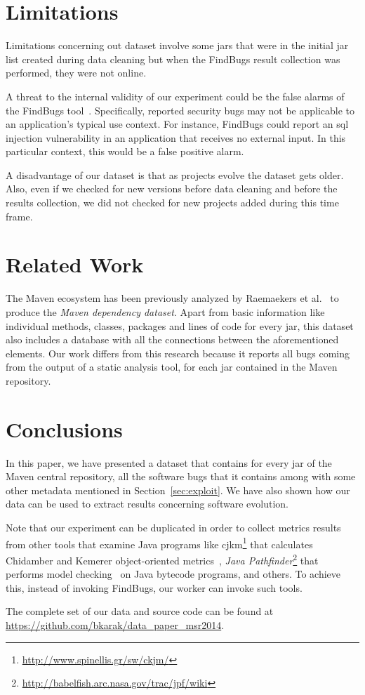 \documentclass{sig-alternate}
\begin{document}
\section{Limitations}
\label{sec:limit}

Limitations concerning out dataset involve some
{\sc jar}s that were in the initial {\sc jar} list
created during data cleaning but when the
FindBugs result collection was performed, they
were not online.

A threat to the internal validity of our experiment could be the false
alarms of the FindBugs tool~\cite{AP10}.
Specifically, reported security bugs may not
be applicable to an application's typical use context.
For instance, FindBugs could report an {\sc sql}
injection vulnerability
in an application that receives no external input.
In this particular context, this would be a false
positive alarm.

A disadvantage of our dataset is that as projects evolve
the dataset gets older. Also, even if we checked for
new versions before data cleaning and before
the results collection, we did not checked for new
projects added during this time frame.

\section{Related Work}
\label{sec:rel}

The Maven ecosystem has been previously analyzed by
Raemaekers et al.~\cite{RDV13}
to produce the {\it Maven dependency dataset}.
Apart from basic information like individual methods, classes,
packages and lines of code for every {\sc jar}, this dataset
also includes a database with all the
connections between the aforementioned elements.
Our work differs from this research because it
reports all bugs coming from the output of a
static analysis tool, for each {\sc jar}
contained in the Maven repository.

\section{Conclusions}
\label{sec:conc}

In this paper, we have presented a dataset that contains
for every {\sc jar} of the Maven central repository,
all the software bugs that it contains among with some
other metadata mentioned in Section~\ref{sec:exploit}.
We have also shown how our data can be
used to extract results concerning software evolution.

Note that our experiment can be duplicated
in order to collect metrics results from other tools that
examine Java programs like
{\sc cjkm}\footnote{\url{http://www.spinellis.gr/sw/ckjm/}}
that calculates Chidamber and Kemerer
object-oriented metrics~\cite{CK91},
{\it Java Pathfinder}\footnote{\url{http://babelfish.arc.nasa.gov/trac/jpf/wiki}}
that performs
model checking~\cite{CEES09} on Java bytecode programs,
and others. To achieve this, instead of invoking
FindBugs, our worker can invoke such tools.

The complete set of our data and source code
can be found at
\url{https://github.com/bkarak/data_paper_msr2014}.


  
\end{document}

